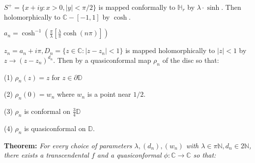 \documentclass{beamer}
\begin{document}
\begin{frame} 

{\tiny $S^+ = \{ x + iy : x > 0, |y| < \pi/2 \}$ is mapped conformally to $\mathbb{H}_r$ by $\lambda\cdot\sinh$. Then holomorphically to $\mathbb{C} - [-1,1]$ by $\cosh$.

\vspace{2.5mm}

$a_n = \cosh^{-1}\left( \frac{\pi}{\lambda} \left[ \frac{\lambda}{\pi} \cosh(n\pi) \right] \right)$

\vspace{2.5mm}

$z_n = a_n + i\pi, D_n = \{ z \in \mathbb{C} : \left| z - z_n \right| < 1\} $ is mapped holomorphically to $|z|<1$ by $z\rightarrow (z - z_n)^{d_n}$. Then by a quasiconformal map $\rho_n$ of the disc so that: 

\hspace{5mm} (1) $\rho_n(z)=z$ for $z\in\partial\mathbb{D}$

\hspace{5mm} (2) $\rho_n(0)=w_n$ where $w_n$ is a point near $1/2$.

\hspace{5mm} (3) $\rho_n$ is conformal on $\frac{3}{4}\mathbb{D}$

\hspace{5mm} (4) $\rho_n$ is quasiconformal on $\mathbb{D}$.  

}

\vspace{5mm}

{\bf Theorem:}  {\it For every choice of parameters $\lambda, (d_n), (w_n)$ with $\lambda \in \pi\mathbb{N}, d_n \in 2\mathbb{N}$, there exists a transcendental $f$ and a quasiconformal $\phi: \mathbb{C}\rightarrow\mathbb{C}$ so that:}


\end{frame}
\end{document}
